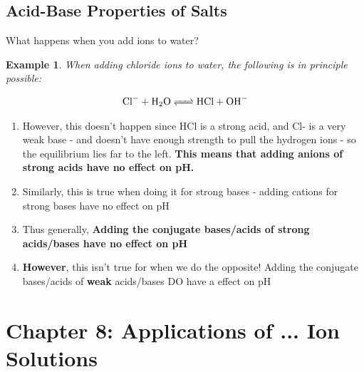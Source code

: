 \documentclass{article}  %
\newtheorem{exmp}{Example}
\begin{document}
\subsection*{Acid-Base Properties of Salts}
What happens when you add ions to water? 
\newline
\begin{exmp}
    When adding chloride ions to water, the following is in principle possible:
\end{exmp}
\begin{equation*}
    \begin{aligned}
        \ce{Cl- + H2O <=> HCl + OH-}
    \end{aligned}
\end{equation*}
\begin{enumerate}
    \item However, this doesn't happen since HCl is a strong acid, and Cl- is a very weak base - and doesn't have enough strength to pull the hydrogen ions - so the equilibrium lies far to the left. \textbf{This means that adding anions of strong acids have no effect on pH.} 
    \item Similarly, this is true when doing it for strong bases - adding cations for strong bases have no effect on pH
    \item Thus generally, \textbf{Adding the conjugate bases/acids of strong acids/bases have no effect on pH}
    \item \textbf{However}, this isn't true for when we do the opposite! Adding the conjugate bases/acids of \textbf{weak} acids/bases DO have a effect on pH 
\end{enumerate} 

\section*{Chapter 8: Applications of ... Ion Solutions}
\end{document}
